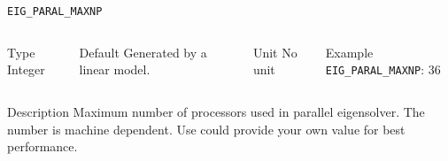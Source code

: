 \begin{frame}[allowframebreaks]{\texttt{EIG\_PARAL\_MAXNP}} \label{EIG_PARAL_MAXNP}
\vspace*{-12pt}
\begin{columns}
\begin{block}{Type}
Integer
\end{block}

\begin{block}{Default}
Generated by a linear model.
\end{block}

\begin{block}{Unit}
No unit
\end{block}

\begin{block}{Example}
\texttt{EIG\_PARAL\_MAXNP}: 36
\end{block}
\end{columns}

\begin{block}{Description}
Maximum number of processors used in parallel eigensolver. The number is machine dependent. Use could provide your own value for best performance. 
\end{block}

\end{frame}

